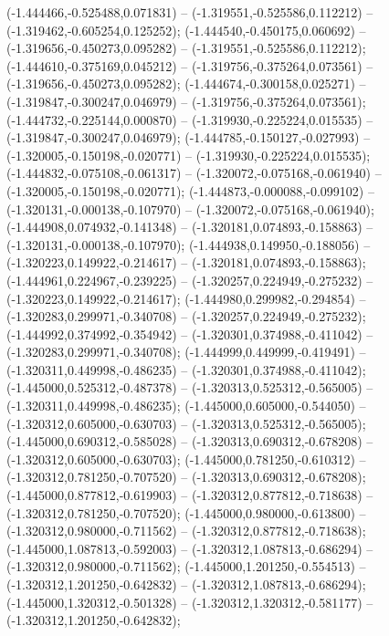  (-1.444466,-0.525488,0.071831) -- (-1.319551,-0.525586,0.112212) -- (-1.319462,-0.605254,0.125252);
 (-1.444540,-0.450175,0.060692) -- (-1.319656,-0.450273,0.095282) -- (-1.319551,-0.525586,0.112212);
 (-1.444610,-0.375169,0.045212) -- (-1.319756,-0.375264,0.073561) -- (-1.319656,-0.450273,0.095282);
 (-1.444674,-0.300158,0.025271) -- (-1.319847,-0.300247,0.046979) -- (-1.319756,-0.375264,0.073561);
 (-1.444732,-0.225144,0.000870) -- (-1.319930,-0.225224,0.015535) -- (-1.319847,-0.300247,0.046979);
 (-1.444785,-0.150127,-0.027993) -- (-1.320005,-0.150198,-0.020771) -- (-1.319930,-0.225224,0.015535);
 (-1.444832,-0.075108,-0.061317) -- (-1.320072,-0.075168,-0.061940) -- (-1.320005,-0.150198,-0.020771);
 (-1.444873,-0.000088,-0.099102) -- (-1.320131,-0.000138,-0.107970) -- (-1.320072,-0.075168,-0.061940);
 (-1.444908,0.074932,-0.141348) -- (-1.320181,0.074893,-0.158863) -- (-1.320131,-0.000138,-0.107970);
 (-1.444938,0.149950,-0.188056) -- (-1.320223,0.149922,-0.214617) -- (-1.320181,0.074893,-0.158863);
 (-1.444961,0.224967,-0.239225) -- (-1.320257,0.224949,-0.275232) -- (-1.320223,0.149922,-0.214617);
 (-1.444980,0.299982,-0.294854) -- (-1.320283,0.299971,-0.340708) -- (-1.320257,0.224949,-0.275232);
 (-1.444992,0.374992,-0.354942) -- (-1.320301,0.374988,-0.411042) -- (-1.320283,0.299971,-0.340708);
 (-1.444999,0.449999,-0.419491) -- (-1.320311,0.449998,-0.486235) -- (-1.320301,0.374988,-0.411042);
 (-1.445000,0.525312,-0.487378) -- (-1.320313,0.525312,-0.565005) -- (-1.320311,0.449998,-0.486235);
 (-1.445000,0.605000,-0.544050) -- (-1.320312,0.605000,-0.630703) -- (-1.320313,0.525312,-0.565005);
 (-1.445000,0.690312,-0.585028) -- (-1.320313,0.690312,-0.678208) -- (-1.320312,0.605000,-0.630703);
 (-1.445000,0.781250,-0.610312) -- (-1.320312,0.781250,-0.707520) -- (-1.320313,0.690312,-0.678208);
 (-1.445000,0.877812,-0.619903) -- (-1.320312,0.877812,-0.718638) -- (-1.320312,0.781250,-0.707520);
 (-1.445000,0.980000,-0.613800) -- (-1.320312,0.980000,-0.711562) -- (-1.320312,0.877812,-0.718638);
 (-1.445000,1.087813,-0.592003) -- (-1.320312,1.087813,-0.686294) -- (-1.320312,0.980000,-0.711562);
 (-1.445000,1.201250,-0.554513) -- (-1.320312,1.201250,-0.642832) -- (-1.320312,1.087813,-0.686294);
 (-1.445000,1.320312,-0.501328) -- (-1.320312,1.320312,-0.581177) -- (-1.320312,1.201250,-0.642832);

